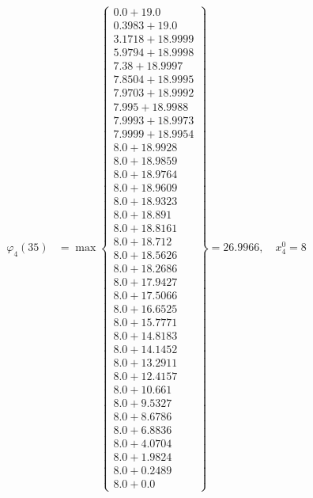 \documentclass{article}
\begin{document}
\begin{align*}
  
\varphi_{4}(35) &= \max \left\{ \begin{array}{c}
0.0 + 19.0 \\
 0.3983 + 19.0 \\
 3.1718 + 18.9999 \\
 5.9794 + 18.9998 \\
 7.38 + 18.9997 \\
 7.8504 + 18.9995 \\
 7.9703 + 18.9992 \\
 7.995 + 18.9988 \\
 7.9993 + 18.9973 \\
 7.9999 + 18.9954 \\
 8.0 + 18.9928 \\
 8.0 + 18.9859 \\
 8.0 + 18.9764 \\
 8.0 + 18.9609 \\
 8.0 + 18.9323 \\
 8.0 + 18.891 \\
 8.0 + 18.8161 \\
 8.0 + 18.712 \\
 8.0 + 18.5626 \\
 8.0 + 18.2686 \\
 8.0 + 17.9427 \\
 8.0 + 17.5066 \\
 8.0 + 16.6525 \\
 8.0 + 15.7771 \\
 8.0 + 14.8183 \\
 8.0 + 14.1452 \\
 8.0 + 13.2911 \\
 8.0 + 12.4157 \\
 8.0 + 10.661 \\
 8.0 + 9.5327 \\
 8.0 + 8.6786 \\
 8.0 + 6.8836 \\
 8.0 + 4.0704 \\
 8.0 + 1.9824 \\
 8.0 + 0.2489 \\
 8.0 + 0.0
\end{array} \right\}=26.9966,\quad x_{4}^0=8\\
  
  
  

\end{align*}
\end{document}
